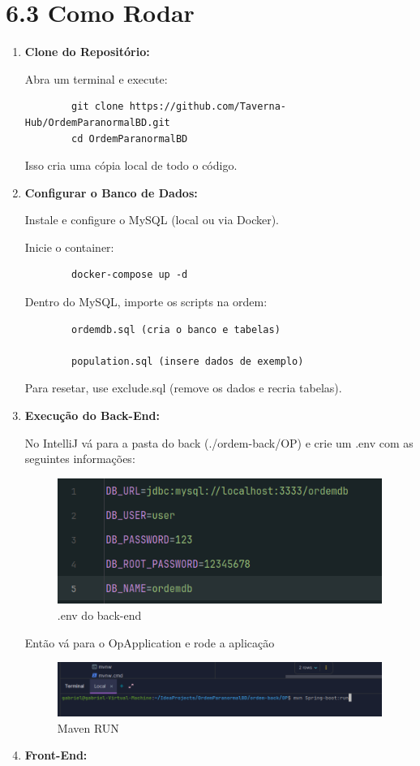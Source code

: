 \documentclass[12pt,a4paper]{report}
\begin{document}
\section{6.3 Como Rodar}
    \begin{enumerate}
        \item \textbf{Clone do Repositório:}
        
        Abra um terminal e execute:
        \begin{lstlisting}
        git clone https://github.com/Taverna-Hub/OrdemParanormalBD.git
        cd OrdemParanormalBD
        \end{lstlisting}
        
        Isso cria uma cópia local de todo o código.
        
        \item \textbf{Configurar o Banco de Dados:}
        
        Instale e configure o MySQL (local ou via Docker).
        
        Inicie o container:

        \begin{lstlisting}
        docker-compose up -d
        \end{lstlisting}

        
        Dentro do MySQL, importe os scripts na ordem:
        \begin{lstlisting}
        ordemdb.sql (cria o banco e tabelas)
        
        population.sql (insere dados de exemplo)

        \end{lstlisting}
        Para resetar, use exclude.sql (remove os dados e recria tabelas).
        
        \item \textbf{Execução do Back-End:}
        
        No IntelliJ vá para a pasta do back (./ordem-back/OP) e crie um .env com as seguintes informações:
       
       
       \begin{figure}[H]
    \centering
    \includegraphics[width=0.5\linewidth]{env_back.png}
    \caption{.env do back-end}
    \label{fig:enter-label}
\end{figure}
        Então vá para o OpApplication e rode a aplicação 
        \begin{figure}[H]
    \centering
    \includegraphics[width=0.5\linewidth]{Screenshot_1.png}
    \caption{Maven RUN}
    \label{fig:enter-label}
\end{figure}
\item \textbf{Front-End:}


\end{enumerate}
\end{document}
